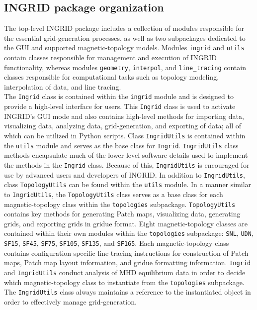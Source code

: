 \subsection{\label{sec:label2}INGRID package organization}
The top-level INGRID package includes a collection of modules responsible for the essential grid-generation processes, as well as two subpackages dedicated to the GUI and supported magnetic-topology models. Modules \texttt{ingrid} and \texttt{utils} contain classes responsible for management and execution of INGRID functionality, whereas modules \texttt{geometry}, \texttt{interpol}, and \texttt{line\_tracing} contain classes responsible for computational tasks such as topology modeling, interpolation of data, and line tracing. \\ \indent
The \texttt{Ingrid} class is contained within the \texttt{ingrid} module and is designed to provide a high-level interface for users. This \texttt{Ingrid} class is used to activate INGRID's GUI mode and also contains high-level methods for importing data, visualizing data, analyzing data, grid-generation, and exporting of data; all of which can be utilized in Python scripts. Class \texttt{IngridUtils} is contained within the \texttt{utils} module and serves as the base class for \texttt{Ingrid}. \texttt{IngridUtils} class methods encapsulate much of the lower-level software details used to implement the methods in the \texttt{Ingrid} class. Because of this, \texttt{IngridUtils} is encouraged for use by advanced users and developers of INGRID. In addition to \texttt{IngridUtils}, class \texttt{TopologyUtils} can be found within the \texttt{utils} module. In a manner similar to \texttt{IngridUtils}, the \texttt{TopologyUtils} class serves as a base class for each magnetic-topology class within the \texttt{topologies} subpackage. \texttt{TopologyUtils} contains key methods for generating Patch maps, visualizing data, generating grids, and exporting grids in gridue format. Eight magnetic-topology classes are contained within their own modules within the \texttt{topologies} subpackage: \texttt{SNL}, \texttt{UDN}, \texttt{SF15}, \texttt{SF45}, \texttt{SF75}, \texttt{SF105}, \texttt{SF135}, and \texttt{SF165}. Each magnetic-topology class contains configuration specific line-tracing instructions for construction of Patch maps, Patch map layout information, and gridue formatting information. \texttt{Ingrid} and \texttt{IngridUtils} conduct analysis of MHD equilibrium data in order to decide which magnetic-topology class to instantiate from the \texttt{topologies} subpackage. The \texttt{IngridUtils} class always maintains a reference to the instantiated object in order to effectively manage grid-generation.\\ \indent
